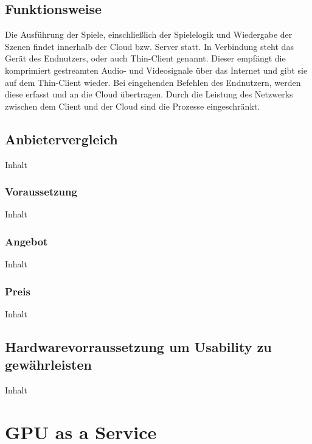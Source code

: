 \documentclass[12pt,toc=bib,toc=listof]{scrreprt}
\begin{document}
\section{Funktionsweise}
\label{sec:Funktionsweise}

Die Ausführung der Spiele, einschließlich der Spielelogik und Wiedergabe der Szenen findet innerhalb der Cloud bzw. Server statt. In Verbindung steht das Gerät des Endnutzers, oder auch Thin-Client genannt. Dieser empfängt die komprimiert gestreamten Audio- und Videosignale über das Internet und gibt sie auf dem Thin-Client wieder. Bei eingehenden Befehlen des Endnutzern, werden diese erfasst und an die Cloud übertragen. Durch die Leistung des Netzwerks zwischen dem Client und der Cloud sind die Prozesse eingeschränkt.

\section{Anbietervergleich}
\label{sec:Anbietervergleich}

Inhalt

\subsection{Voraussetzung}
\label{sec:Vorraussetzung}

Inhalt

\subsection{Angebot}
\label{sec:Angebot}

Inhalt

\subsection{Preis}
\label{sec:Preis}

Inhalt

\section{Hardwarevorraussetzung um Usability zu gewährleisten}
\label{sec:Hardwarevorraussetzung um Usability zu gewährleisten}

Inhalt

\chapter{GPU as a Service}
\label{sec:GPU as a Service}
\end{document}
